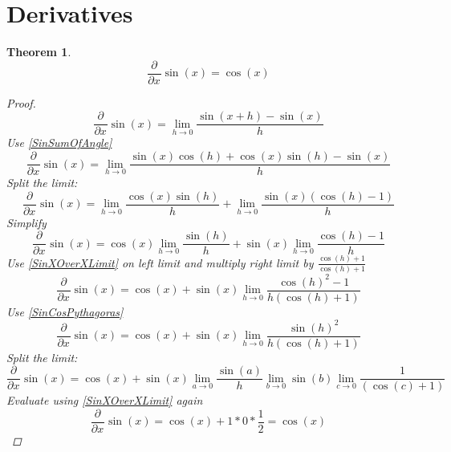 \documentclass[]{article}
\newcommand{\pqty}[1]{{\left(#1\right)}}
\newcommand{\pdiff}[2]{\frac{\partial^{#2}}{\partial #1^{#2}}}
\newtheorem{theorem}{Theorem}[section]
\numberwithin{equation}{section}
\begin{document}
	\section{Derivatives}
	\begin{theorem}
	\begin{equation}
	\pdiff{x}{}\sin\pqty{x}=\cos\pqty{x}
	\end{equation}
	\begin{proof}
		\begin{equation}
			\pdiff{x}{}\sin\pqty{x}=
			\lim\limits_{h\to 0}\frac{\sin\pqty{x+h}-\sin\pqty{x}}{h}
		\end{equation}
		Use \eqref{SinSumOfAngle}
		\begin{equation}
		\pdiff{x}{}\sin\pqty{x}=
		\lim\limits_{h\to 0}\frac{\sin\pqty{x}\cos\pqty{h}+\cos\pqty{x}\sin\pqty{h}-\sin\pqty{x}}{h}
		\end{equation}
		Split the limit:
		\begin{equation}
		\pdiff{x}{}\sin\pqty{x}=
		\lim\limits_{h\to 0}\frac{\cos\pqty{x}\sin\pqty{h}}{h}
		+
		\lim\limits_{h\to 0}\frac{\sin\pqty{x}\pqty{\cos\pqty{h}-1}}{h}
		\end{equation}
		Simplify
		\begin{equation}
		\pdiff{x}{}\sin\pqty{x}=
		\cos\pqty{x}\lim\limits_{h\to 0}\frac{\sin\pqty{h}}{h}
		+
		\sin\pqty{x}\lim\limits_{h\to 0}\frac{{\cos\pqty{h}-1}}{h}
		\end{equation}
		Use \eqref{SinXOverXLimit} on left limit and multiply right limit by \(\frac{\cos\pqty{h}+1}{\cos\pqty{h}+1}\)
		\begin{equation}
		\pdiff{x}{}\sin\pqty{x}=
		\cos\pqty{x}
		+
		\sin\pqty{x}\lim\limits_{h\to 0}\frac{{\cos\pqty{h}^2-1}}{h\pqty{\cos\pqty{h}+1}}
		\end{equation}
		Use \eqref{SinCosPythagoras}
		\begin{equation}
		\pdiff{x}{}\sin\pqty{x}=
		\cos\pqty{x}
		+
		\sin\pqty{x}\lim\limits_{h\to 0}\frac{{\sin\pqty{h}^2}}{h\pqty{\cos\pqty{h}+1}}
		\end{equation}
		Split the limit:
		\begin{equation}
		\pdiff{x}{}\sin\pqty{x}=
		\cos\pqty{x}
		+
		\sin\pqty{x}\lim\limits_{a\to 0}\frac{{\sin\pqty{a}}}{h}
		\lim\limits_{b\to 0}{{\sin\pqty{b}}}
		\lim\limits_{c\to 0}\frac{1}{\pqty{\cos\pqty{c}+1}}
		\end{equation}
		Evaluate using \eqref{SinXOverXLimit} again
		\begin{equation}
		\pdiff{x}{}\sin\pqty{x}=
		\cos\pqty{x}
		+
		1
		*0
		*\frac{1}{2}=
		\cos\pqty{x}
		\end{equation}
	\end{proof}
	\end{theorem}
	
\end{document}
